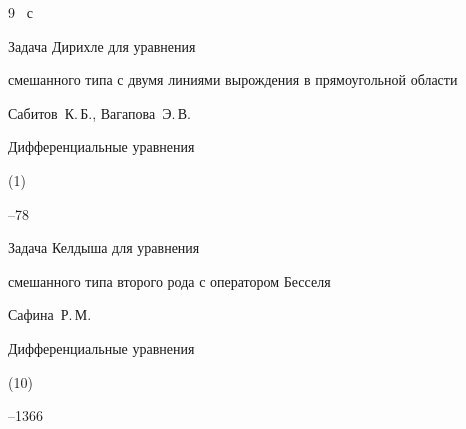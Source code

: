 \begin{thebibliography}{9}
~с




\paper Задача Дирихле для уравнения

смешанного типа с двумя линиями вырождения в прямоугольной области

\by Сабитов~К.\,Б., Вагапова~Э.\,В.

\jour Дифференциальные уравнения


(1)

--78




\paper Задача Келдыша для уравнения

смешанного типа второго рода с оператором Бесселя

\by Сафина~Р.\,М.

\jour Дифференциальные уравнения


(10)

--1366

\end{thebibliography}







\newpage






\makeengtitlem








%


%


















































